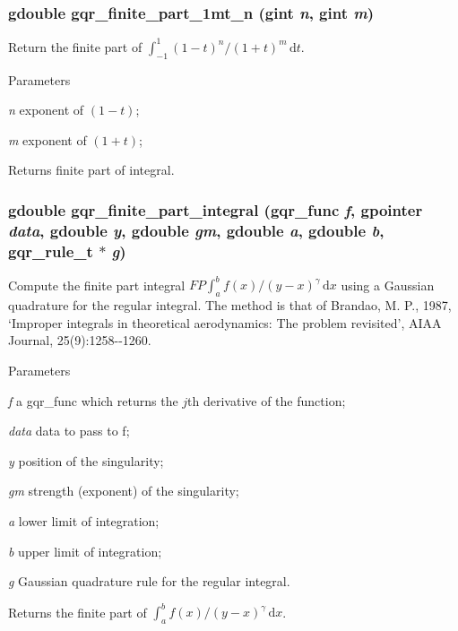 \subsubsection[{gqr\_\-finite\_\-part\_\-1mt\_\-n}]{\setlength{\rightskip}{0pt plus 5cm}gdouble gqr\_\-finite\_\-part\_\-1mt\_\-n (gint {\em n}, \/  gint {\em m})}\label{group__finite_gaf599fd6c488ff6d9e2959ddf585265a4}
Return the finite part of $\int_{-1}^{1}(1-t)^n/(1+t)^m\,\mathrm{d}t$.


\begin{DoxyParams}{Parameters}
\item[{\em n}]exponent of $(1-t)$; \item[{\em m}]exponent of $(1+t)$;\end{DoxyParams}
\begin{DoxyReturn}{Returns}
finite part of integral. 
\end{DoxyReturn}
\subsubsection[{gqr\_\-finite\_\-part\_\-integral}]{\setlength{\rightskip}{0pt plus 5cm}gdouble gqr\_\-finite\_\-part\_\-integral ({\bf gqr\_\-func} {\em f}, \/  gpointer {\em data}, \/  gdouble {\em y}, \/  gdouble {\em gm}, \/  gdouble {\em a}, \/  gdouble {\em b}, \/  {\bf gqr\_\-rule\_\-t} $\ast$ {\em g})}\label{group__finite_gae1a0bb5eaf86443d1881606dca14b892}
Compute the finite part integral $FP\int_{a}^{b}f(x)/(y-x)^{\gamma}\,\mathrm{d}x$ using a Gaussian quadrature for the regular integral. The method is that of Brandao, M. P., 1987, `Improper integrals in theoretical aerodynamics: The problem revisited', AIAA Journal, 25(9):1258-\/-\/1260.


\begin{DoxyParams}{Parameters}
\item[{\em f}]a gqr\_\-func which returns the $j$th derivative of the function; \item[{\em data}]data to pass to f; \item[{\em y}]position of the singularity; \item[{\em gm}]strength (exponent) of the singularity; \item[{\em a}]lower limit of integration; \item[{\em b}]upper limit of integration; \item[{\em g}]Gaussian quadrature rule for the regular integral.\end{DoxyParams}
\begin{DoxyReturn}{Returns}
the finite part of $\int_{a}^{b}f(x)/(y-x)^{\gamma}\,\mathrm{d}x$. 
\end{DoxyReturn}
